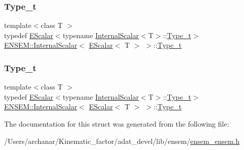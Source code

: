 \subsubsection{\texorpdfstring{Type\_t}{Type\_t}\hspace{0.1cm}{\footnotesize\ttfamily [1/2]}}
{\footnotesize\ttfamily template$<$class T $>$ \\
typedef \mbox{\hyperlink{classENSEM_1_1EScalar}{E\+Scalar}}$<$typename \mbox{\hyperlink{structENSEM_1_1InternalScalar}{Internal\+Scalar}}$<$T$>$\+::\mbox{\hyperlink{structENSEM_1_1InternalScalar_3_01EScalar_3_01T_01_4_01_4_a2f304cf7e12b0c7a448c8094b39fd90d}{Type\+\_\+t}}$>$ \mbox{\hyperlink{structENSEM_1_1InternalScalar}{E\+N\+S\+E\+M\+::\+Internal\+Scalar}}$<$ \mbox{\hyperlink{classENSEM_1_1EScalar}{E\+Scalar}}$<$ T $>$ $>$\+::\mbox{\hyperlink{structENSEM_1_1InternalScalar_3_01EScalar_3_01T_01_4_01_4_a2f304cf7e12b0c7a448c8094b39fd90d}{Type\+\_\+t}}}

\mbox{\label{structENSEM_1_1InternalScalar_3_01EScalar_3_01T_01_4_01_4_a2f304cf7e12b0c7a448c8094b39fd90d}} 
\subsubsection{\texorpdfstring{Type\_t}{Type\_t}\hspace{0.1cm}{\footnotesize\ttfamily [2/2]}}
{\footnotesize\ttfamily template$<$class T $>$ \\
typedef \mbox{\hyperlink{classENSEM_1_1EScalar}{E\+Scalar}}$<$typename \mbox{\hyperlink{structENSEM_1_1InternalScalar}{Internal\+Scalar}}$<$T$>$\+::\mbox{\hyperlink{structENSEM_1_1InternalScalar_3_01EScalar_3_01T_01_4_01_4_a2f304cf7e12b0c7a448c8094b39fd90d}{Type\+\_\+t}}$>$ \mbox{\hyperlink{structENSEM_1_1InternalScalar}{E\+N\+S\+E\+M\+::\+Internal\+Scalar}}$<$ \mbox{\hyperlink{classENSEM_1_1EScalar}{E\+Scalar}}$<$ T $>$ $>$\+::\mbox{\hyperlink{structENSEM_1_1InternalScalar_3_01EScalar_3_01T_01_4_01_4_a2f304cf7e12b0c7a448c8094b39fd90d}{Type\+\_\+t}}}



The documentation for this struct was generated from the following file\+:\begin{DoxyCompactItemize}
\item 
/\+Users/archanar/\+Kinematic\+\_\+factor/adat\+\_\+devel/lib/ensem/\mbox{\hyperlink{lib_2ensem_2ensem__ensem_8h}{ensem\+\_\+ensem.\+h}}\end{DoxyCompactItemize}

